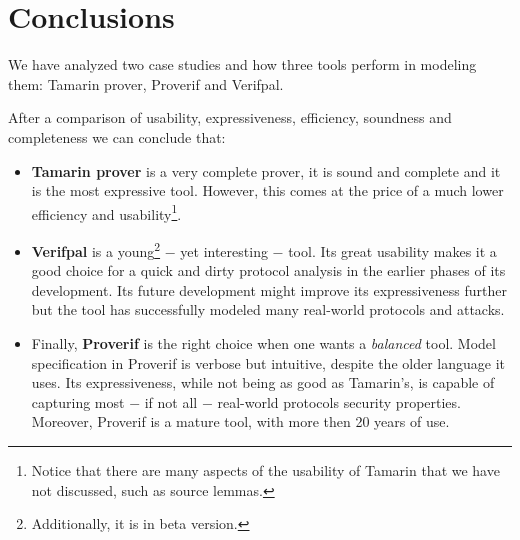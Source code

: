 
\section{Conclusions}
\label{section:conclusions}

We have analyzed two case studies and how three tools perform in modeling them: Tamarin prover, Proverif and Verifpal.

After a comparison of usability, expressiveness, efficiency, soundness and completeness we can conclude that:
\begin{itemize}
    \item{\textbf{Tamarin prover} is a very complete prover, it is sound and complete and it is the most expressive tool. However, this comes at the price of a much lower efficiency and usability\footnote{Notice that there are many aspects of the usability of Tamarin that we have not discussed, such as source lemmas.}.}
    \item{\textbf{Verifpal} is a young\footnote{Additionally, it is in beta version.} $-$ yet interesting $-$ tool. Its great usability makes it a good choice for a quick and dirty protocol analysis in the earlier phases of its development. Its future development might improve its expressiveness further but the tool has successfully modeled many real-world protocols and attacks.}
    \item{Finally, \textbf{Proverif} is the right choice when one wants a \textit{balanced} tool. Model specification in Proverif is verbose but intuitive, despite the older language it uses. Its expressiveness, while not being as good as Tamarin's, is capable of capturing most $-$ if not all $-$ real-world protocols security properties. Moreover, Proverif is a mature tool, with more then 20 years of use.}
\end{itemize}
